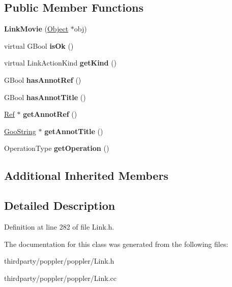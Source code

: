 \subsection*{Public Member Functions}
\begin{DoxyCompactItemize}
\item 
\mbox{\label{class_link_movie_a25c1bd5c488c1cc3858a5c0acf228603}} 
{\bfseries Link\+Movie} (\hyperlink{class_object}{Object} $\ast$obj)
\item 
\mbox{\label{class_link_movie_a7e6f3d5e25565ac20a34fa9d88e7e493}} 
virtual G\+Bool {\bfseries is\+Ok} ()
\item 
\mbox{\label{class_link_movie_a7efc6846d7f163ebc141a8924139f2e4}} 
virtual Link\+Action\+Kind {\bfseries get\+Kind} ()
\item 
\mbox{\label{class_link_movie_afad4e9b061362e6906086eff8697d1ce}} 
G\+Bool {\bfseries has\+Annot\+Ref} ()
\item 
\mbox{\label{class_link_movie_ae84f770dc59bfcc2d9394793ea147196}} 
G\+Bool {\bfseries has\+Annot\+Title} ()
\item 
\mbox{\label{class_link_movie_a7614b10043d849c6e4d2a39a32539f20}} 
\hyperlink{struct_ref}{Ref} $\ast$ {\bfseries get\+Annot\+Ref} ()
\item 
\mbox{\label{class_link_movie_a5b6fd39ba0592c13aafef90689769b32}} 
\hyperlink{class_goo_string}{Goo\+String} $\ast$ {\bfseries get\+Annot\+Title} ()
\item 
\mbox{\label{class_link_movie_aa9147d7ebd3d057baacd250bac69725b}} 
Operation\+Type {\bfseries get\+Operation} ()
\end{DoxyCompactItemize}
\subsection*{Additional Inherited Members}


\subsection{Detailed Description}


Definition at line 282 of file Link.\+h.



The documentation for this class was generated from the following files\+:\begin{DoxyCompactItemize}
\item 
thirdparty/poppler/poppler/Link.\+h\item 
thirdparty/poppler/poppler/Link.\+cc\end{DoxyCompactItemize}
